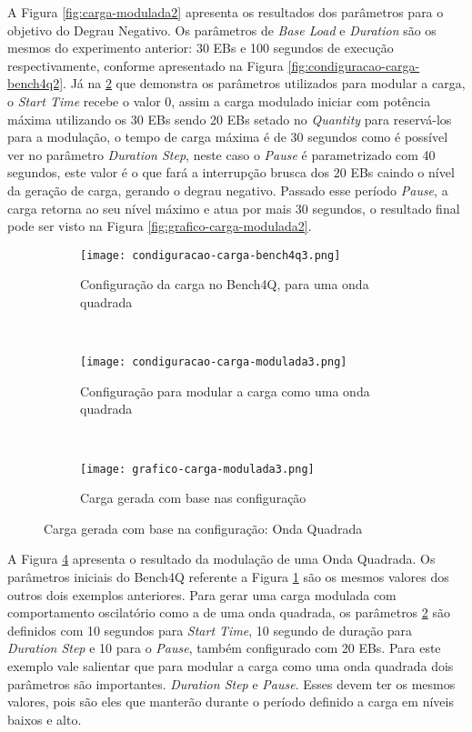 A Figura \ref{fig:carga-modulada2} apresenta os resultados dos parâmetros para o objetivo do Degrau Negativo. Os parâmetros de \textit{Base Load} e \textit{Duration} são os mesmos do experimento anterior: 30 EBs e 100 segundos de execução respectivamente, conforme apresentado na Figura \ref{fig:condiguracao-carga-bench4q2}. Já na \ref{fig:condiguracao-carga-modulada3} que demonstra os parâmetros utilizados para modular a carga, o \textit{Start Time} recebe o valor 0, assim a carga modulado iniciar com potência máxima utilizando os 30 EBs sendo 20 EBs setado no \textit{Quantity} para reservá-los para a modulação, o tempo de carga máxima é de 30 segundos como é possível ver no parâmetro \textit{Duration Step}, neste caso o \textit{Pause} é parametrizado com 40 segundos, este valor é o que fará a interrupção brusca dos 20 EBs caindo o nível da geração de carga, gerando o degrau negativo. Passado esse período \textit{Pause}, a carga retorna ao seu nível máximo e atua por mais 30 segundos, o resultado final pode ser visto na Figura \ref{fig:grafico-carga-modulada2}. 

\begin{figure}[!htb]
	\begin{subfigure}{\linewidth}
		\centering
		\texttt{[image: condiguracao-carga-bench4q3.png]}
		\caption{Configuração da carga no Bench4Q, para uma onda quadrada}
		\label{fig:condiguracao-carga-bench4q3}
	\end{subfigure}\\
	\begin{subfigure}{\linewidth}
		\centering
		\texttt{[image: condiguracao-carga-modulada3.png]}
		\caption{Configuração para modular a carga como uma onda quadrada}
		\label{fig:condiguracao-carga-modulada3}
	\end{subfigure}\\[1ex]
	\begin{subfigure}{\linewidth}
		\centering
		\texttt{[image: grafico-carga-modulada3.png]}
		\caption{Carga gerada com base nas configuração}
		\label{fig:grafico-carga-modulada3}
	\end{subfigure}
	\caption{Carga gerada com base na configuração: Onda Quadrada}
	\label{fig:carga-modulada3}
	\fautor
\end{figure}

A Figura \ref{fig:carga-modulada3} apresenta o resultado da modulação de uma Onda Quadrada. Os parâmetros iniciais do Bench4Q referente a Figura \ref{fig:condiguracao-carga-bench4q3} são os mesmos valores dos outros dois exemplos anteriores. Para gerar uma carga modulada com comportamento oscilatório como a de uma onda quadrada, os parâmetros \ref{fig:condiguracao-carga-modulada3} são definidos com 10 segundos para \textit{Start Time}, 10 segundo de duração para \textit{Duration Step} e 10 para o \textit{Pause}, também configurado com 20 EBs. Para este exemplo vale salientar que para modular a carga como uma onda quadrada dois parâmetros são importantes. \textit{Duration Step} e \textit{Pause}. Esses devem ter os mesmos valores, pois são eles que manterão durante o período definido a carga em níveis baixos e alto. 

